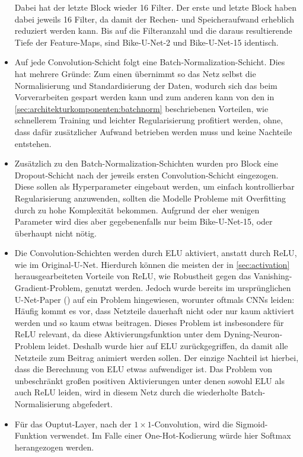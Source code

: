 \begin{itemize}
	Dabei hat der letzte Block wieder 16 Filter. 
	Der erste und letzte Block haben dabei jeweils 16 Filter, da damit der Rechen- und Speicheraufwand erheblich reduziert werden kann.
	Bis auf die Filteranzahl und die daraus resultierende Tiefe der Feature-Maps, sind Bike-U-Net-2 und Bike-U-Net-15 identisch.
	\item Auf jede Convolution-Schicht folgt eine Batch-Normalization-Schicht. 
	Dies hat mehrere Gründe: Zum einen übernimmt so das Netz selbst die Normalisierung und Standardisierung der Daten, 
	wodurch sich das beim Vorverarbeiten gespart werden kann und zum anderen kann von den in \autoref{sec:architekturkomponenten:batchnorm} 
	beschriebenen Vorteilen, wie schnellerem Training und leichter Regularisierung profitiert werden, 
	ohne, dass dafür zusätzlicher Aufwand betrieben werden muss und keine Nachteile entstehen.
	\item Zusätzlich zu den Batch-Normalization-Schichten wurden pro Block eine Dropout-Schicht 
	nach der jeweils ersten Convolution-Schicht eingezogen. Diese sollen als 
    Hyperparameter eingebaut werden, um einfach kontrollierbar Regularisierung anzuwenden, 
	sollten die Modelle Probleme mit Overfitting durch zu hohe Komplexität bekommen. 
	Aufgrund der eher wenigen Parameter wird dies aber gegebenenfalls nur beim Bike-U-Net-15, 
	oder überhaupt nicht nötig.
	\item Die Convolution-Schichten werden durch \ac{ELU} aktiviert, anstatt durch \ac{ReLU}, wie im Original-U-Net. 
	Hierdurch können die meisten der in \autoref{sec:activation} herausgearbeiteten Vorteile von \ac{ReLU},
	wie Robustheit gegen das Vanishing-Gradient-Problem, genutzt werden. Jedoch wurde bereits im ursprünglichen U-Net-Paper 
	(\cite{Ronneberger.18052015}) auf ein Problem hingewiesen, worunter oftmals \acp{CNN} leiden: Häufig kommt es vor, 
	dass Netzteile dauerhaft nicht oder nur kaum aktiviert werden und so kaum etwas beitragen. 
	Dieses Problem ist insbesondere für \ac{ReLU} relevant, da diese Aktivierungsfunktion unter dem Dyning-Neuron-Problem leidet.
	Deshalb wurde hier auf \ac{ELU} zurückgegriffen, da damit alle Netzteile zum Beitrag animiert werden sollen. 
	Der einzige Nachteil ist hierbei, dass die Berechnung von \ac{ELU} etwas aufwendiger ist. 
	Das Problem von unbeschränkt großen positiven Aktivierungen unter denen sowohl \ac{ELU} als auch \ac{ReLU} leiden,
	wird in diesem Netz durch die wiederholte Batch-Normalisierung abgefedert.
	\item Für das Ouptut-Layer, nach der $1\times 1$-Convolution, wird die Sigmoid-Funktion verwendet. 
	Im Falle einer One-Hot-Kodierung würde hier Softmax herangezogen werden. 
\end{itemize}

